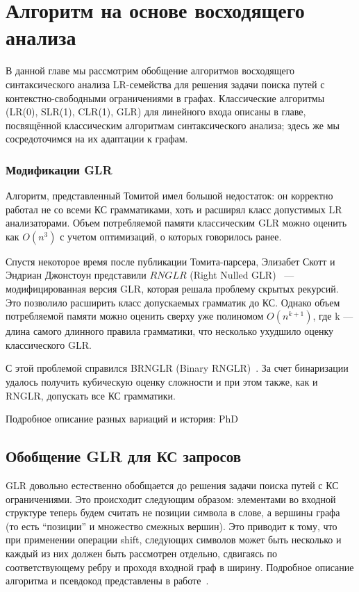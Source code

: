 \chapter{Алгоритм на основе восходящего анализа}\label{chpt:GLR}

В данной главе мы рассмотрим обобщение алгоритмов восходящего синтаксического анализа LR-семейства для решения задачи поиска путей с контекстно-свободными ограничениями в графах.
Классические алгоритмы (LR(0), SLR(1), CLR(1), GLR) для линейного входа описаны в главе, посвящённой классическим алгоритмам синтаксического анализа; здесь же мы сосредоточимся на их адаптации к графам.

\subsection{Модификации GLR}
Алгоритм, представленный Томитой имел большой недостаток: он корректно работал не со всеми КС грамматиками, хоть и расширял класс допустимых LR анализаторами. Объем потребляемой памяти классическим GLR можно оценить как $ O(n^3)$ с учетом оптимизаций, о которых говорилось ранее.

Спустя некоторое время после публикации Томита-парсера, Элизабет Скотт и Эндриан Джонстоун представили $RNGLR$ (Right Nulled GLR)~\cite{Scott:2006:RNG:1146809.1146810} --- модифицированная версия GLR, которая решала проблему скрытых рекурсий. Это позволило расширить класс допускаемых грамматик до КС. Однако объем потребляемой памяти можно оценить сверху уже полиномом $O(n^{k+1})$, где k --- длина самого длинного правила грамматики, что несколько ухудшило оценку классического GLR.

С этой проблемой справился BRNGLR (Binary RNGLR)~\cite{Scott:2007:BCT:1289813.1289815}. За счет бинаризации удалось получить кубическую оценку сложности и при этом также, как и RNGLR, допускать все КС грамматики.

Подробное описание разных вариаций и история: PhD~\cite{Economopoulos2006GeneralisedLP}

\section{Обобщение GLR для КС запросов}

GLR довольно естественно обобщается до решения задачи поиска путей с КС ограничениями. Это происходит следующим образом: элементами во входной структуре теперь будем считать не позиции символа в слове, а вершины графа (то есть ``позиции'' и множество смежных вершин). Это приводит к тому, что при применении операции shift, следующих символов может быть несколько и каждый из них должен быть рассмотрен отдельно, сдвигаясь по соответствующему ребру и проходя входной граф в ширину. Подробное описание алгоритма и псевдокод представлены в работе~\cite{10.1007/978-3-319-41579-6_22}.

